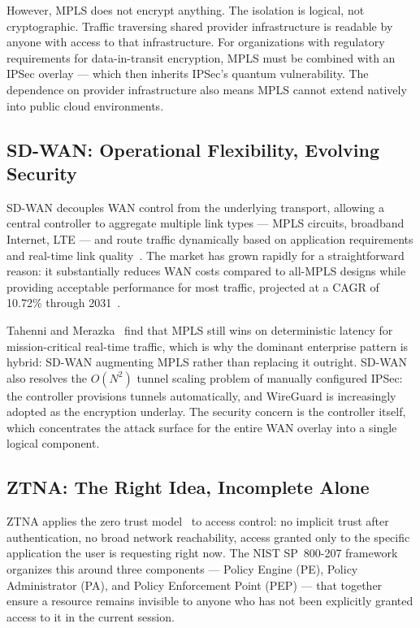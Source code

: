 \documentclass[conference]{IEEEtran}
\begin{document}
However, MPLS does not encrypt anything. The isolation is
logical, not cryptographic. Traffic traversing shared provider
infrastructure is readable by anyone with access to that
infrastructure. For organizations with regulatory requirements
for data-in-transit encryption, MPLS must be combined with
an IPSec overlay --- which then inherits IPSec's quantum
vulnerability. The dependence on provider infrastructure also
means MPLS cannot extend natively into public cloud
environments.

\subsection{SD-WAN: Operational Flexibility, Evolving Security}

SD-WAN decouples WAN control from the underlying transport,
allowing a central controller to aggregate multiple link types
--- MPLS circuits, broadband Internet, LTE --- and route traffic
dynamically based on application requirements and real-time
link quality~\cite{tahenni2024}. The market has grown rapidly
for a straightforward reason: it substantially reduces WAN costs
compared to all-MPLS designs while providing acceptable
performance for most traffic, projected at a CAGR of 10.72\%
through 2031~\cite{fortinet_sdwan}.

Tahenni and Merazka~\cite{tahenni2024} find that MPLS still
wins on deterministic latency for mission-critical real-time
traffic, which is why the dominant enterprise pattern is
hybrid: SD-WAN augmenting MPLS rather than replacing it
outright. SD-WAN also resolves the $O(N^2)$ tunnel scaling
problem of manually configured IPSec: the controller provisions
tunnels automatically, and WireGuard is increasingly adopted
as the encryption underlay. The security concern is the
controller itself, which concentrates the attack surface for
the entire WAN overlay into a single logical component.

\subsection{ZTNA: The Right Idea, Incomplete Alone}

ZTNA applies the zero trust model~\cite{nist800207} to access
control: no implicit trust after authentication, no broad
network reachability, access granted only to the specific
application the user is requesting right now. The NIST
SP~800-207 framework organizes this around three components ---
Policy Engine (PE), Policy Administrator (PA), and Policy
Enforcement Point (PEP) --- that together ensure a resource
remains invisible to anyone who has not been explicitly granted
access to it in the current session.
\end{document}
